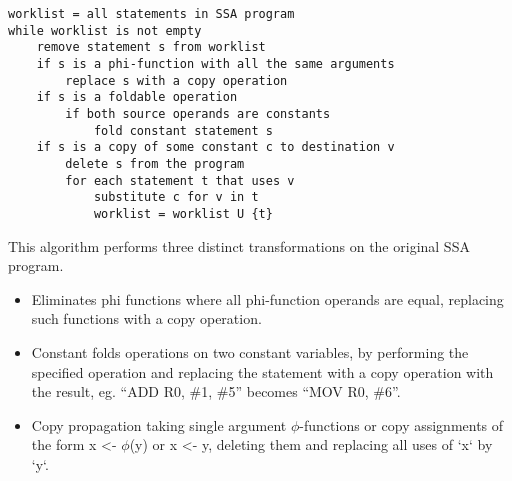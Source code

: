 \documentclass[a4paper,10pt]{report}
\begin{document}
\begin{verbatim}
worklist = all statements in SSA program
while worklist is not empty
    remove statement s from worklist
    if s is a phi-function with all the same arguments
        replace s with a copy operation
    if s is a foldable operation
        if both source operands are constants
            fold constant statement s
    if s is a copy of some constant c to destination v
        delete s from the program
        for each statement t that uses v
            substitute c for v in t
            worklist = worklist U {t}
\end{verbatim}
This algorithm performs three distinct transformations on the original SSA program.
\begin{itemize}
 \item Eliminates phi functions where all phi-function operands are equal, replacing such functions with a copy operation.
 \item Constant folds operations on two constant variables, by performing the specified operation and replacing the statement
        with a copy operation with the result, eg. ``ADD R0, \#1, \#5'' becomes ``MOV R0, \#6''.
 \item Copy propagation taking single argument \(\phi\)-functions or copy assignments of the form x <- \(\phi\)(y) or x <- y, 
        deleting them and replacing all uses of `x` by `y`.
\end{itemize}
\end{document}
